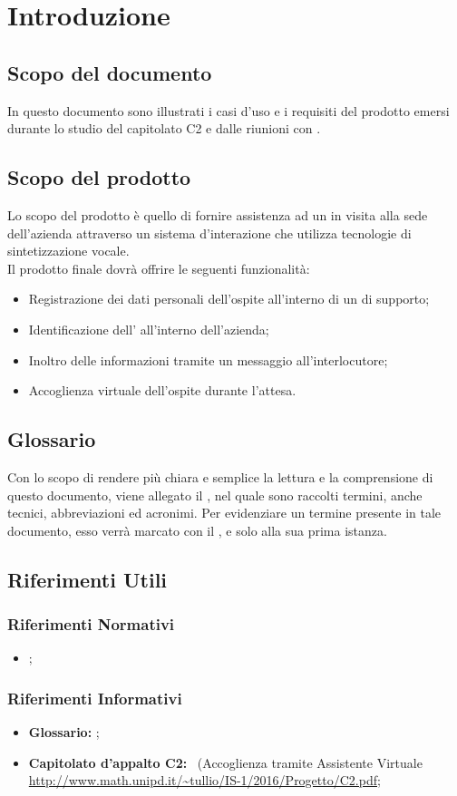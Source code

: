 \documentclass[../AnalisiDeiRquisiti.tex]{subfiles}
\begin{document}
\section{Introduzione}

	\subsection{Scopo del documento}
	In questo documento sono illustrati i casi d'uso e i requisiti del prodotto emersi durante lo studio del capitolato C2 e dalle riunioni con \prop.
	
	\subsection{Scopo del prodotto}
	Lo scopo del prodotto è quello di fornire assistenza ad un  in visita alla sede dell'azienda attraverso un sistema d'interazione che utilizza tecnologie di sintetizzazione vocale.
	\\Il prodotto finale dovrà offrire le seguenti funzionalità:
	\begin{itemize}
		\item Registrazione dei dati personali dell'ospite all'interno di un  di supporto;
		\item Identificazione dell' all'interno dell'azienda;
		\item Inoltro delle informazioni tramite un messaggio  all'interlocutore;
		\item Accoglienza virtuale dell'ospite durante l'attesa.
	\end{itemize}

	\subsection{Glossario}
	Con lo scopo di rendere più chiara e semplice la lettura e la comprensione di questo documento, viene allegato il \glossariov, nel quale sono raccolti termini, anche tecnici, abbreviazioni ed acronimi. Per evidenziare un termine presente in tale documento, esso verrà marcato con il , e solo alla sua prima istanza.
	
	\subsection{Riferimenti Utili}
		\subsubsection{Riferimenti Normativi}
		\begin{itemize}
			\item \textbf{\normediprogettov};
		\end{itemize}
	
		\subsubsection{Riferimenti Informativi}	
		\begin{itemize}
			\item \textbf{Glossario:} \glossariov;
			\item\textbf{Capitolato d'appalto C2:} \progetto\ (Accoglienza tramite Assistente Virtuale \\ \url{http://www.math.unipd.it/~tullio/IS-1/2016/Progetto/C2.pdf};
		\end{itemize}
			
\end{document}
